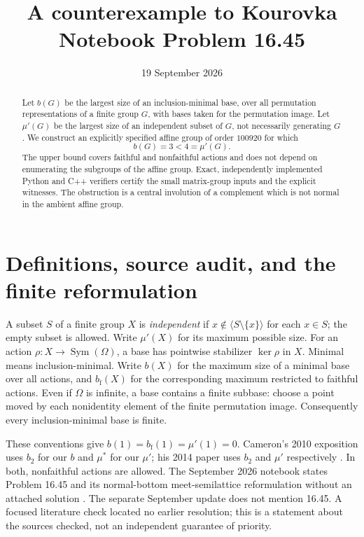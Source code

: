 \documentclass[11pt]{article}
\title{A counterexample to Kourovka Notebook Problem 16.45}
\author{}
\date{19 September 2026}
\theoremstyle{remark}\newtheorem{remark}[theorem]{Remark}
\newcommand{\mup}{\mu'}
\newcommand{\bfth}{b_{\mathrm f}}
\newcommand{\Sym}{\operatorname{Sym}}
\begin{document}
\maketitle
\begin{abstract}
Let $b(G)$ be the largest size of an inclusion-minimal base, over all
permutation representations of a finite group $G$, with bases taken for the
permutation image. Let $\mup(G)$ be the largest size of an independent subset
of $G$, not necessarily generating $G$. We construct an explicitly specified
affine group of order $100920$ for which
\[
                 b(G)=3<4=\mup(G).
\]
The upper bound covers faithful and nonfaithful actions and does not depend on
enumerating the subgroups of the affine group. Exact, independently implemented
Python and C++ verifiers certify the small matrix-group inputs and the explicit
witnesses. The obstruction is a central involution of a complement which is not
normal in the ambient affine group.
\end{abstract}

\section{Definitions, source audit, and the finite reformulation}
A subset $S$ of a finite group $X$ is \emph{independent} if
$x\notin\langle S\setminus\{x\}\rangle$ for each $x\in S$; the empty subset is
allowed. Write $\mup(X)$ for its maximum possible size. For an action
$\rho:X\to\Sym(\Omega)$, a base has pointwise stabilizer $\ker\rho$ in $X$.
Minimal means inclusion-minimal. Write $b(X)$ for the maximum size of a minimal
base over all actions, and $\bfth(X)$ for the corresponding maximum restricted
to faithful actions. Even if $\Omega$ is infinite, a base contains a finite
subbase: choose a point moved by each nonidentity element of the finite
permutation image. Consequently every inclusion-minimal base is finite.

These conventions give $b(1)=\bfth(1)=\mup(1)=0$. Cameron's 2010 exposition
uses $b_2$ for our $b$ and $\mu^*$ for our $\mup$; his 2014 paper uses $b_2$ and
$\mu'$ respectively \cite{blog,paper}. In both, nonfaithful actions are allowed.
The September 2026 notebook states Problem 16.45 and its normal-bottom
meet-semilattice reformulation without an attached solution \cite{notebook}.
The separate September update does not mention 16.45. A focused literature
check located no earlier resolution; this is a statement about the sources
checked, not an independent guarantee of priority.
\end{document}
